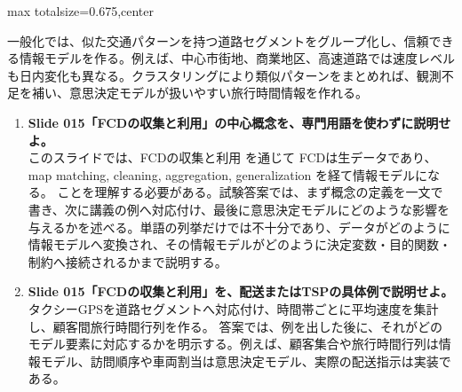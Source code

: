 \begin{adjustbox}{max totalsize={\textwidth}{0.675\textheight},center}
\begin{minipage}{\textwidth}
\begin{minipage}[t]{0.485\textwidth}
一般化では、似た交通パターンを持つ道路セグメントをグループ化し、信頼できる情報モデルを作る。例えば、中心市街地、商業地区、高速道路では速度レベルも日内変化も異なる。クラスタリングにより類似パターンをまとめれば、観測不足を補い、意思決定モデルが扱いやすい旅行時間情報を作れる。\par
{}
\begin{enumerate}
\item \textbf{Slide 015「FCDの収集と利用」の中心概念を、専門用語を使わずに説明せよ。}\\このスライドでは、FCDの収集と利用 を通じて FCDは生データであり、map matching, cleaning, aggregation, generalization を経て情報モデルになる。 ことを理解する必要がある。試験答案では、まず概念の定義を一文で書き、次に講義の例へ対応付け、最後に意思決定モデルにどのような影響を与えるかを述べる。単語の列挙だけでは不十分であり、データがどのように情報モデルへ変換され、その情報モデルがどのように決定変数・目的関数・制約へ接続されるかまで説明する。
\item \textbf{Slide 015「FCDの収集と利用」を、配送またはTSPの具体例で説明せよ。}\\タクシーGPSを道路セグメントへ対応付け、時間帯ごとに平均速度を集計し、顧客間旅行時間行列を作る。 答案では、例を出した後に、それがどのモデル要素に対応するかを明示する。例えば、顧客集合や旅行時間行列は情報モデル、訪問順序や車両割当は意思決定モデル、実際の配送指示は実装である。
\end{enumerate}
\end{minipage}
\end{minipage}
\end{adjustbox}

